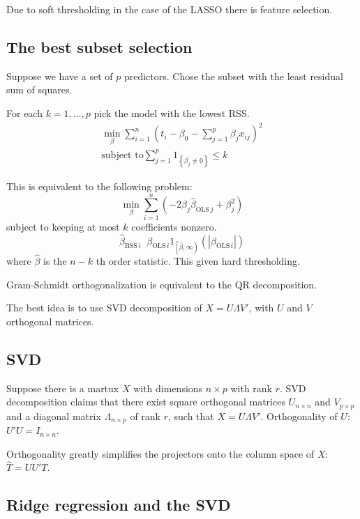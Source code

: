 \documentclass[a4paper]{article}
\newcommand{\obj}[1]{{\left\{ #1 \right \}}}
\newcommand{\clop}[1]{{\left [ #1 \right )}}
\newcommand{\brac}[1]{{\left ( #1 \right )}}
\newcommand{\abs}[1]{{\left | #1 \right |}}
\newcommand{\defn}{\mathop{\overset{\Delta}{=}}\nolimits}
\begin{document}
Due to soft thresholding in the case of the LASSO there is feature selection.


\subsection*{The best subset selection} %
\label{sub:the_best_subset_selection}
Suppose we have a set of $p$ predictors. Chose the subset with the least
residual sum of squares.

For each $k = 1,\ldots, p$ pick the model with the lowest RSS.
\begin{align*}
\min_{\beta} \sum_{i=1}^n \brac{t_i - \beta_0 - \sum_{j=1}^p \beta_j x_{ij}}^2 \\
\text{subject to} \sum_{j=1}^p 1_\obj{\beta_j\neq 0} \leq k
\end{align*}

This is equivalent to the following problem:
\[\min_{\beta} \sum_{i=1}^n \brac{ - 2 \beta_j \hat{\beta}_{\text{OLS}\,j} + \beta_j^2 }\]
subject to keeping at most $k$ coefficients nonzero.
\[\hat{\beta}_{\text{BSS}\,i} \defn \beta_{\text{OLS}\,i} 1_{\clop{\hat{\beta}, \infty}}\brac{ \abs{\beta_{\text{OLS}\,i}} }\]
where $\hat{\beta}$ is the $n-k$ th order statistic. This given hard thresholding.

Gram-Schmidt orthogonalization is equivalent to the QR decomposition.

The best idea is to use SVD decomposition of $X = U\Lambda V'$, with $U$ and $V$ orthogonal matrices.


\subsection*{SVD} %
\label{sub:svd}

Suppose there is a martux $X$ with dimensions $n\times p$ with rank $r$.
SVD decomposition claims that there exist square orthogonal matrices $U_{n\times n}$ and $V_{p\times p}$
and a diagonal matrix $\Lambda_{n\times p}$ of rank $r$, such that $X = U \Lambda V'$.
Orthogonality of $U$: $U'U = I_{n\times n}$.

Orthogonality greatly simplifies the projectors onto the column space of $X$: $\hat{T} = U U' T$.


\subsection*{Ridge regression and the SVD} %
\label{sub:ridge_regression_and_the_svd}
\end{document}
